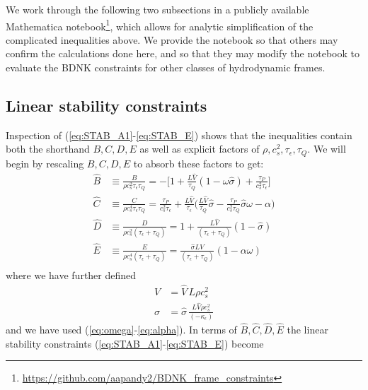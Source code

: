 \documentclass[%
notitlepage,
superscriptaddress,
nofootinbib,
amsmath,
amssymb,
aps,
twocolumn
]{revtex4-1}
\begin{document}
We work through the following two subsections in a publicly available Mathematica notebook\footnote{\url{https://github.com/aapandy2/BDNK_frame_constraints}}, which allows for analytic simplification of the complicated inequalities above.  We provide the notebook so that others may confirm the calculations done here, and so that they may modify the notebook to evaluate the BDNK constraints for other classes of hydrodynamic frames.

\subsection{Linear stability constraints}

Inspection of (\ref{eq:STAB_A1}-\ref{eq:STAB_E}) shows that the inequalities contain both the shorthand $B, C, D, E$ as well as explicit factors of $\rho, c_s^2, \tau_{\epsilon}, \tau_{Q}$.  We will begin by rescaling $B, C, D, E$ to absorb these factors to get:
\begin{equation} \label{eq:rescaled_shorthand}
\begin{aligned}
\hat{B} &\equiv \frac{B}{\rho c_s^2 \tau_{\epsilon} \tau_{Q}} = - \Big[ 1 + \frac{L \hat{V}}{\tau_{Q}} (1 - \omega \hat{\sigma}) + \frac{\tau_{P}}{c_s^2 \tau_{\epsilon}} \Big] \\
\hat{C} &\equiv \frac{C}{\rho c_s^4 \tau_{\epsilon} \tau_{Q}} = \frac{\tau_{P}}{c_s^2 \tau_{\epsilon}} + \frac{L \hat{V}}{\tau_{\epsilon}} \Big( \frac{L \hat{V}}{\tau_{Q}} \hat{\sigma} - \frac{\tau_{P}}{c_s^2 \tau_{Q}} \hat{\sigma} \omega - \alpha \Big) \\
\hat{D} &\equiv \frac{D}{\rho c_s^2 (\tau_{\epsilon} + \tau_{Q})} = 1 + \frac{L \hat{V}}{(\tau_{\epsilon} + \tau_{Q})} (1 - \hat{\sigma}) \\
\hat{E} &\equiv \frac{E}{\rho c_s^4 (\tau_{\epsilon} + \tau_{Q})} = \frac{\hat{\sigma} L \hat{V}}{(\tau_{\epsilon} + \tau_{Q})} (1 - \alpha \omega) \\
\end{aligned}
\end{equation}
where we have further defined
\begin{equation}
\begin{aligned}
V &= \hat{V} \, L \rho c_s^2 \\
\sigma &= \hat{\sigma} \, \frac{L \hat{V} \rho c_s^2}{(-\kappa_{\epsilon})}
\end{aligned}
\end{equation}
and we have used (\ref{eq:omega}-\ref{eq:alpha}).  In terms of $\hat{B}, \hat{C}, \hat{D}, \hat{E}$ the linear stability constraints (\ref{eq:STAB_A1}-\ref{eq:STAB_E}) become
\end{document}
